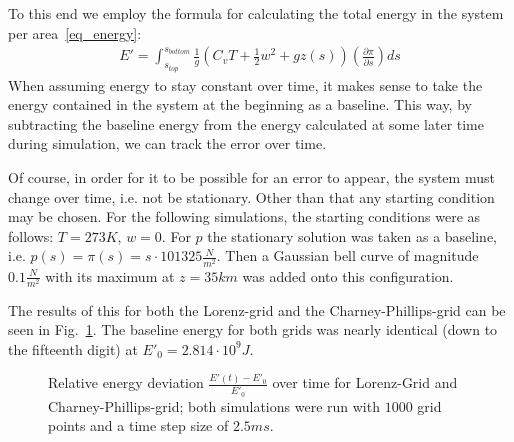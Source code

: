 To this end we employ the formula for calculating the total energy in the system per area~\ref{eq_energy}:
\begin{align*}
E'=\int_{s_{top}}^{s_{bottom}} \frac{1}{g}(C_vT+\frac{1}{2}w^2 + gz(s)) \left( \frac{\partial \pi}{\partial s} \right) ds
\end{align*}
When assuming energy to stay constant over time, it makes sense to take the energy contained in the system at the beginning as a baseline.
This way, by subtracting the baseline energy from the energy calculated at some later time during simulation, we can track the error over time.

Of course, in order for it to be possible for an error to appear, the system must change over time, i.e. not be stationary.
Other than that any starting condition may be chosen.
For the following simulations, the starting conditions were as follows: $T=273K$, $w=0$.
For $p$ the stationary solution was taken as a baseline, i.e. $p(s)=\pi (s)=s\cdot 101325\frac{N}{m^2}$.
Then a Gaussian bell curve of magnitude $0.1\frac{N}{m^2}$ with its maximum at $z=35km$ was added onto this configuration.

The results of this for both the Lorenz-grid and the Charney-Phillips-grid can be seen in Fig.~\ref{fig:energy_error}.
The baseline energy for both grids was nearly identical (down to the fifteenth digit) at $E'_0=2.814\cdot 10^9J$. %

\begin{figure}[!h]
    \caption{Relative energy deviation $\frac{E'(t)-E'_0}{E'_0}$ over time for Lorenz-Grid and Charney-Phillips-grid;
    both simulations were run with $1000$ grid points and a time step size of $2.5ms$.}
    \label{fig:energy_error}
\end{figure}

